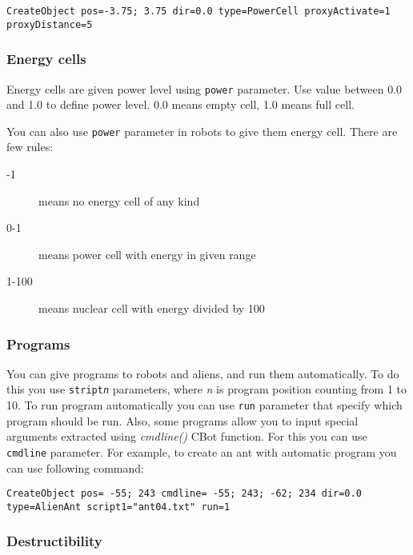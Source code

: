 \begin{lstlisting}[style=scene]
CreateObject pos=-3.75; 3.75 dir=0.0 type=PowerCell proxyActivate=1 proxyDistance=5
\end{lstlisting}



\subsubsection{Energy cells}

Energy cells are given power level using \texttt{power} parameter. Use value between 0.0 and 1.0 to define power level. 0.0 means empty cell, 1.0 means full cell.

You can also use \texttt{power} parameter in robots to give them energy cell. There are few rules:

\begin{description}
    \item[-1] means no energy cell of any kind
    \item[0-1] means power cell with energy in given range
    \item[1-100] means nuclear cell with energy divided by 100
\end{description}


\subsubsection{Programs}

You can give programs to robots and aliens, and run them automatically. To do this you use \texttt{stript\emph{n}} parameters, where \emph{n} is program position counting from 1 to 10. To run program automatically you can use \texttt{run} parameter that specify which program should be run. Also, some programs allow you to input special arguments extracted using \emph{cmdline()} CBot function. For this you can use \texttt{cmdline} parameter. For example, to create an ant with automatic program you can use following command:

\begin{lstlisting}[style=scene]
CreateObject pos= -55; 243 cmdline= -55; 243; -62; 234 dir=0.0 type=AlienAnt script1="ant04.txt" run=1
\end{lstlisting}


\subsubsection{Destructibility}

